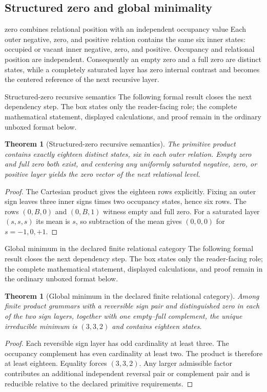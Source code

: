 \documentclass[11pt]{article}
\numberwithin{equation}{section}
\newtheorem{theorem}[definition]{Theorem}
\theoremstyle{remark}
\begin{document}
\subsection{Structured zero and global minimality}
\begin{conceptledger}{zero combines relational position with an independent occupancy value}
Each outer negative, zero, and positive relation contains the same six inner states: occupied or vacant inner negative, zero, and positive. Occupancy and relational position are independent. Consequently an empty zero and a full zero are distinct states, while a completely saturated layer has zero internal contrast and becomes the centered reference of the next recursive layer.
\end{conceptledger}
\begin{proofguide}{Structured-zero recursive semantics}
The following formal result closes the next dependency step. The box states only the reader-facing role; the complete mathematical statement, displayed calculations, and proof remain in the ordinary unboxed format below.
\end{proofguide}
\begin{theorem}[Structured-zero recursive semantics]
The primitive product contains exactly eighteen distinct states, six in each outer relation. Empty zero and full zero both exist, and centering any uniformly saturated negative, zero, or positive layer yields the zero vector of the next relational level.
\end{theorem}
\begin{proof}
The Cartesian product gives the eighteen rows explicitly. Fixing an outer sign leaves three inner signs times two occupancy states, hence six rows. The rows $(0,B,0)$ and $(0,B,1)$ witness empty and full zero. For a saturated layer $(s,s,s)$ its mean is $s$, so subtraction of the mean gives $(0,0,0)$ for $s=-1,0,+1$.
\end{proof}
\begin{proofguide}{Global minimum in the declared finite relational category}
The following formal result closes the next dependency step. The box states only the reader-facing role; the complete mathematical statement, displayed calculations, and proof remain in the ordinary unboxed format below.
\end{proofguide}
\begin{theorem}[Global minimum in the declared finite relational category]
Among finite product grammars with a reversible sign pair and distinguished zero in each of the two sign layers, together with one empty--full complement, the unique irreducible minimum is $(3,3,2)$ and contains eighteen states.
\end{theorem}
\begin{proof}
Each reversible sign layer has odd cardinality at least three. The occupancy complement has even cardinality at least two. The product is therefore at least eighteen. Equality forces $(3,3,2)$. Any larger admissible factor contributes an additional independent reversal pair or complement pair and is reducible relative to the declared primitive requirements.
\end{proof}
\end{document}
